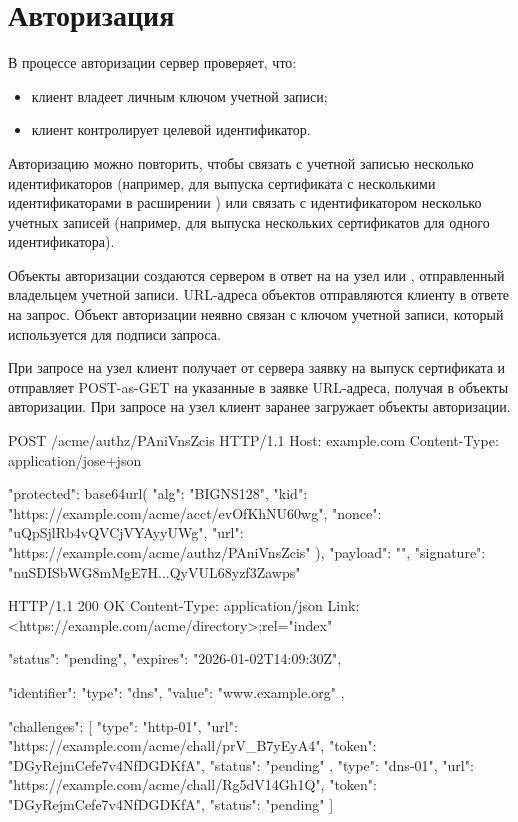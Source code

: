 \section{Авторизация}\label{ACME.Authz}

В процессе авторизации сервер проверяет, что:
\begin{itemize}
\item 
клиент владеет личным ключом учетной записи;
\item 
клиент контролирует целевой идентификатор. 
\end{itemize}

Авторизацию можно повторить, чтобы связать с учетной записью несколько
идентификаторов (например, для выпуска сертификата с несколькими
идентификаторами в расширении ) или связать
с идентификатором несколько учетных записей (например, для выпуска нескольких
сертификатов для одного идентификатора).

Объекты авторизации создаются сервером в ответ на
 на узел  или
, отправленный владельцем учетной записи. URL-адреса объектов
отправляются клиенту в ответе на запрос. Объект авторизации неявно связан с
ключом учетной записи, который используется для подписи запроса.

При запросе на узел  клиент получает от сервера заявку на выпуск
сертификата и отправляет  POST-as-GET на
указанные в заявке URL-адреса, получая в 
объекты авторизации.
%
При запросе на узел  клиент заранее загружает объекты
авторизации.

\begin{codeblock}
POST /acme/authz/PAniVnsZcis HTTP/1.1
Host: example.com
Content-Type: application/jose+json

{
  "protected": base64url({
    "alg": "BIGNS128",
    "kid": "https://example.com/acme/acct/evOfKhNU60wg",
    "nonce": "uQpSjlRb4vQVCjVYAyyUWg",
    "url": "https://example.com/acme/authz/PAniVnsZcis"
  }),
  "payload": "",
  "signature": "nuSDISbWG8mMgE7H...QyVUL68yzf3Zawps"
}
\end{codeblock}
    
\begin{codeblock}
HTTP/1.1 200 OK
Content-Type: application/json
Link: <https://example.com/acme/directory>;rel="index"

{
  "status": "pending",
  "expires": "2026-01-02T14:09:30Z",

  "identifier": {
    "type": "dns",
    "value": "www.example.org"
  },

  "challenges": [
    {
      "type": "http-01",
      "url": "https://example.com/acme/chall/prV_B7yEyA4",
      "token": "DGyRejmCefe7v4NfDGDKfA",
      "status": "pending"
    },
    {
      "type": "dns-01",
      "url": "https://example.com/acme/chall/Rg5dV14Gh1Q",
      "token": "DGyRejmCefe7v4NfDGDKfA",
      "status": "pending"
    }
  ]
}
\end{codeblock}
\fi

